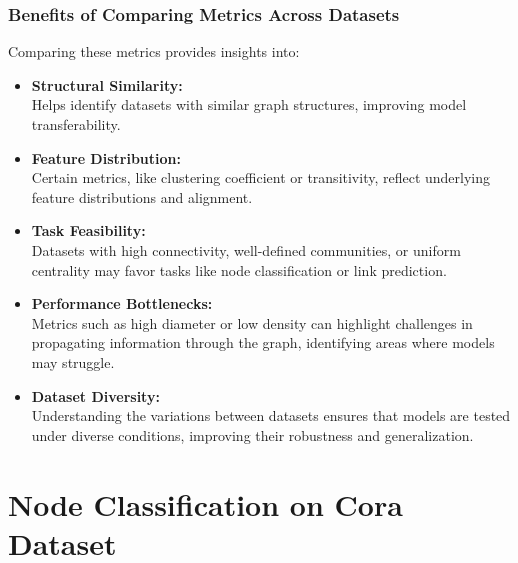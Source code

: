 	\subsubsection*{Benefits of Comparing Metrics Across Datasets}
	Comparing these metrics provides insights into:
	\begin{itemize}
		\item \textbf{Structural Similarity:} \\
		Helps identify datasets with similar graph structures, improving model transferability.
		\item \textbf{Feature Distribution:} \\
		Certain metrics, like clustering coefficient or transitivity, reflect underlying feature distributions and alignment.
		\item \textbf{Task Feasibility:} \\
		Datasets with high connectivity, well-defined communities, or uniform centrality may favor tasks like node classification or link prediction.
		\item \textbf{Performance Bottlenecks:} \\
		Metrics such as high diameter or low density can highlight challenges in propagating information through the graph, identifying areas where models may struggle.
		\item \textbf{Dataset Diversity:} \\
		Understanding the variations between datasets ensures that models are tested under diverse conditions, improving their robustness and generalization.
	\end{itemize}
	

	
	\newpage
	\section{Node Classification on Cora Dataset}
	
